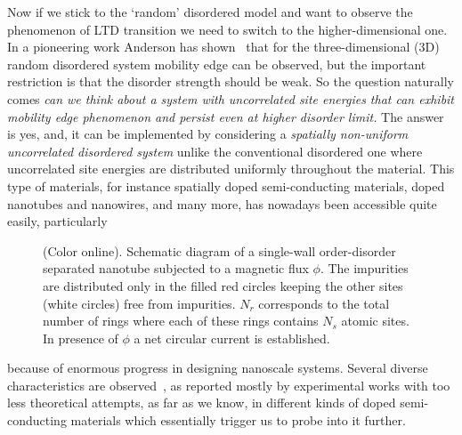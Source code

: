 \documentclass[prb,aps,twocolumn,amsmath,amssymb,floatfix,
superscriptaddress]{revtex4}
\begin{document}
Now if we stick to the `random' disordered model and want to observe the 
phenomenon of LTD transition we need to switch to the higher-dimensional one. 
In a pioneering work Anderson has shown~\cite{ander} that for the 
three-dimensional (3D) random disordered system mobility edge can be observed, 
but the important restriction is that the disorder strength should be weak. 
So the question naturally comes {\em can we think about a system with 
uncorrelated site energies that can exhibit mobility edge phenomenon and 
persist even at higher disorder limit.} The answer is yes, and, it can be 
implemented by considering a {\em spatially non-uniform uncorrelated disordered 
system} unlike the conventional disordered one where uncorrelated site energies 
are distributed 
uniformly throughout the material. This type of materials, for instance 
spatially doped semi-conducting materials, doped nanotubes and nanowires,
and many more, has nowadays been accessible quite easily, particularly 
\begin{figure}[ht]
{\centering {}\par}
\caption{(Color online). Schematic diagram of a single-wall order-disorder
separated nanotube subjected to a magnetic flux $\phi$. The impurities are 
distributed only in the filled red circles keeping the other sites (white
circles) free from impurities. $N_r$ corresponds to the total number of 
rings where each of these rings contains $N_s$ atomic sites. In presence 
of $\phi$ a net circular current is established.}
\label{fig1}
\end{figure}
because of enormous progress in designing nanoscale systems. Several diverse 
characteristics are observed~\cite{div1,div2,div3,div4,div5,div6,div7}, as 
reported mostly by experimental works with too less theoretical attempts, as 
far as we know, in different kinds of doped semi-conducting materials which 
essentially trigger us to probe into it further. 
\end{document}
